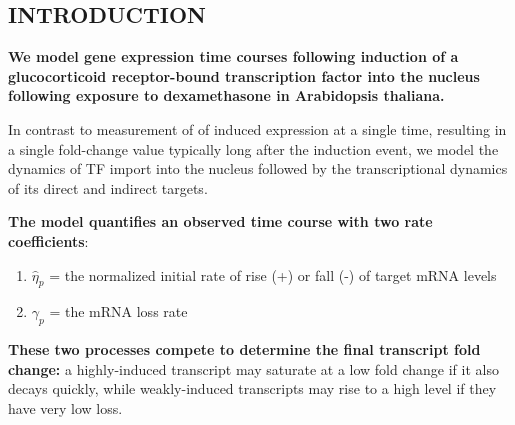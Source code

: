 \documentclass[aspb,landscape]{a0poster}
\begin{document}
\begin{multicols}{3} %

  \color{Black} %




  {
    \titlespacing{\section}{0pt}{0pt}{0pt}
    \section*{INTRODUCTION}

    \textbf{We model gene expression time courses following induction of a glucocorticoid receptor-bound transcription factor into the nucleus following exposure to dexamethasone in Arabidopsis thaliana.}
    
    In contrast to measurement of of induced expression at a single time, resulting in a single fold-change value typically long after the induction event,
    we model the dynamics of TF import into the nucleus followed by the transcriptional dynamics of its direct and indirect targets.
    
    \textbf{The model quantifies an observed time course with two rate coefficients}:
    \begin{enumerate}
    \item $\hat{\eta}_p$ = the normalized initial rate of rise (+) or fall (-) of target mRNA levels
    \item $\gamma_p$ = the mRNA loss rate
    \end{enumerate}
    \textbf{These two processes compete to determine the final transcript fold change:} a highly-induced transcript may saturate at a low fold change if it also decays quickly,
    while weakly-induced transcripts may rise to a high level if they have very low loss.
    
}
\end{multicols}
\end{document}
